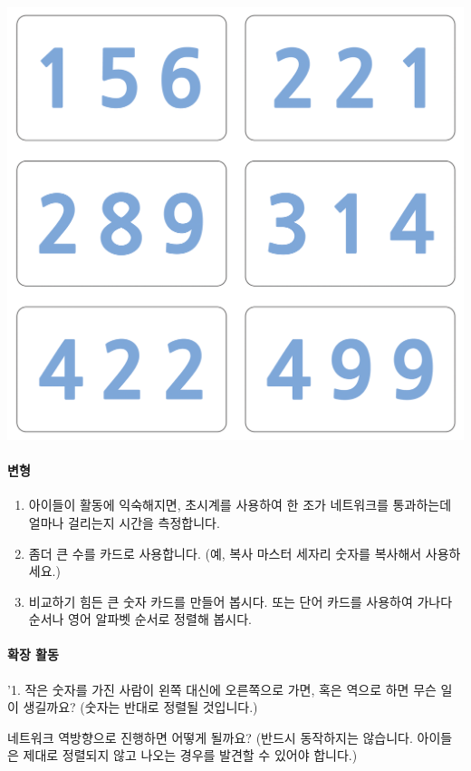 \documentclass[]{article}
\begin{document}
\includegraphics{csunplugged/02-part/img/ch08-parallel/08-parallel-02-photocopy-master-02.png}

\mbox{}\paragraph{변형}\label{section-119}

\begin{enumerate}
\item
  아이들이 활동에 익숙해지면, 초시계를 사용하여 한 조가 네트워크를
  통과하는데 얼마나 걸리는지 시간을 측정합니다.
\item
  좀더 큰 수를 카드로 사용합니다. (예, 복사 마스터 세자리 숫자를
  복사해서 사용하세요.)
\item
  비교하기 힘든 큰 숫자 카드를 만들어 봅시다. 또는 단어 카드를 사용하여
  가나다 순서나 영어 알파벳 순서로 정렬해 봅시다.
\end{enumerate}

\mbox{}\paragraph{확장 활동}\label{section-120}

'1. 작은 숫자를 가진 사람이 왼쪽 대신에 오른쪽으로 가면, 혹은 역으로
하면 무슨 일이 생길까요? (숫자는 반대로 정렬될 것입니다.)

네트워크 역방향으로 진행하면 어떻게 될까요? (반드시 동작하지는 않습니다.
아이들은 제대로 정렬되지 않고 나오는 경우를 발견할 수 있어야 합니다.)
\end{document}
